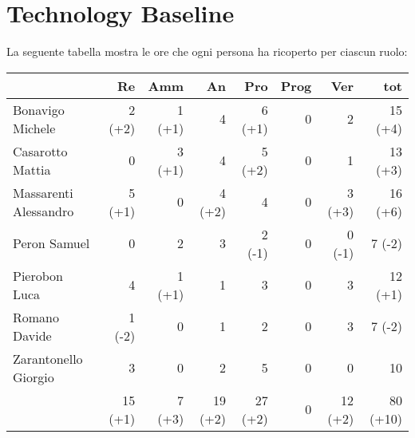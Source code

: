 \section{Technology Baseline}

La seguente tabella mostra le ore che ogni persona ha ricoperto per ciascun ruolo:

\begin{table}[ht]
    \begin{tabularx}{\linewidth}{X|rrrrrrr}
    \rowcolor{gray!30}& Re & Amm & An & Pro & Prog & Ver & tot \\
    \hline
    Bonavigo Michele                        & 2 (+2)     & 1 (+1)   & 4         & 6 (+1)    & 0     & 2         & 15 (+4)\\ 

    \rowcolor{gray!10}Casarotto Mattia      & 0          & 3 (+1)   & 4         & 5 (+2)    & 0     & 1         & 13 (+3)\\ 

    Massarenti Alessandro                   & 5 (+1)     & 0        & 4 (+2)    & 4         & 0     & 3 (+3)    & 16 (+6) \\ 

    \rowcolor{gray!10}Peron Samuel          & 0          & 2        & 3         & 2 (-1)    & 0     & 0 (-1)    & 7 (-2) \\  

    Pierobon Luca                           & 4          & 1 (+1)   & 1         & 3         & 0     & 3         & 12 (+1) \\ 

    \rowcolor{gray!10}Romano Davide         & 1 (-2)     & 0        & 1         & 2         & 0     & 3         & 7 (-2) \\ 

    Zarantonello Giorgio                    & 3          & 0        & 2         & 5         & 0     & 0         & 10     \\ 

    \hline                                  & 15 (+1)    & 7 (+3)   & 19 (+2)   & 27 (+2)   & 0     & 12 (+2)   & 80 (+10) \\ 
    \end{tabularx}
\end{table}


